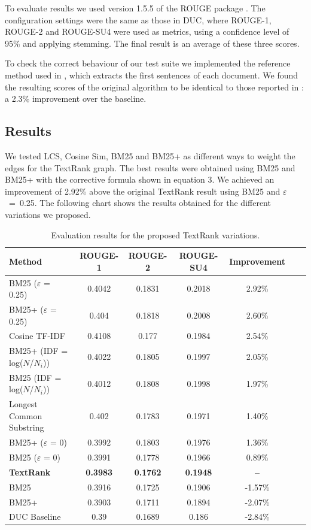 \documentclass{llncs}
\begin{document}
To evaluate results we used version 1.5.5 of the ROUGE package \cite{Lin2004a}. The configuration settings were the same as those in DUC, where ROUGE-1, ROUGE-2 and ROUGE-SU4 were used as metrics, using a confidence level of 95\% and applying stemming. The final result is an average of these three scores.

To check the correct behaviour of our test suite we implemented the reference method used in \cite{mihalcea-tarau}, which extracts the first sentences of each document. We found the resulting scores of the original algorithm to be identical to those reported in \cite{mihalcea-tarau}: a 2.3\% improvement over the baseline.


\subsection{Results}
We tested LCS, Cosine Sim, BM25 and BM25+ as different ways to weight the edges for the TextRank graph. 
The best results were obtained using BM25 and BM25+ with the corrective formula shown in equation 3. We achieved an improvement of 2.92\% above the original TextRank result using BM25 and \mbox{$\varepsilon$ = 0.25}. The following chart shows the results obtained for the different variations we proposed.

\begin{table}
\caption{Evaluation results for the proposed TextRank variations.}
\begin{center}
\begin{tabular}{l*{5}{c}r}
\hline
\rule{0pt}{12pt}
Method & ROUGE-1 & ROUGE-2 & ROUGE-SU4 & Improvement \\[2pt]
\hline\rule{0pt}{12pt}\mbox{}\par\nobreak
BM25 ($\varepsilon$ = 0.25) & 0.4042 & 0.1831 & 0.2018 & 2.92\% \\
BM25+ ($\varepsilon$ = 0.25) & 0.404 & 0.1818 & 0.2008 & 2.60\% \\
Cosine TF-IDF & 0.4108 & 0.177 & 0.1984 & 2.54\% \\
BM25+ (IDF = log($N$/$N_i$)) & 0.4022 & 0.1805 & 0.1997 & 2.05\% \\ 
BM25 (IDF = log($N$/$N_i$)) & 0.4012 & 0.1808 & 0.1998 & 1.97\% \\ 
Longest Common Substring & 0.402 & 0.1783 & 0.1971 & 1.40\% \\
BM25+ ($\varepsilon$ = 0) & 0.3992 & 0.1803 & 0.1976 & 1.36\% \\ 
BM25 ($\varepsilon$ = 0) & 0.3991 & 0.1778 & 0.1966 & 0.89\% \\
\textbf{TextRank} & \textbf{0.3983} & \textbf{0.1762} & \textbf{0.1948} & \textbf{--}\\
BM25 & 0.3916 & 0.1725 & 0.1906 & -1.57\% \\
BM25+ & 0.3903 & 0.1711 & 0.1894 & -2.07\% \\
DUC Baseline & 0.39 & 0.1689 & 0.186 & -2.84\% \\ [2pt]
\hline
\end{tabular}
\end{center}
\end{table}
\end{document}
